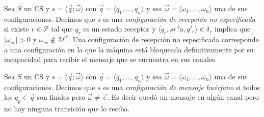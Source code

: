 \begin{definition}Sea $S$ un CS y $s= \langle \overrightarrow{q} ; \overrightarrow{\omega} \rangle$ con $\overrightarrow{q}= \langle q_1, \ldots, q_n \rangle$ y sea $\overrightarrow{\omega}= \langle \omega_1, \ldots, \omega_n \rangle$ una de sus configuraciones. Decimos que $s$ es una \textit{configuración de recepción no especificada} si existe $r \in \mathcal{P}$ tal que $q_r$ es un estado receptor y $\langle q_r,sr?a,q'_r \rangle \in \delta_r$ implica que $|\omega_{sr}| > 0$ y $\omega_{sr} \notin \mathcal{M}^*$. Una configuración de recepción no especificada corresponde a una configuración en la que la máquina está bloqueada definitivamente por su incapacidad para recibir el mensaje que se encuentra en sus canales.
\end{definition}

\begin{definition} Sea $S$ un CS y $s= \langle \overrightarrow{q} ; \overrightarrow{\omega} \rangle$ con $\overrightarrow{q}= \langle q_1, \ldots, q_n \rangle$ y sea $\overrightarrow{\omega}= \langle \omega_1, \ldots, \omega_n \rangle$ una de sus configuraciones. Decimos que $s$ es una \textit{configuración de mensaje huérfano} si todos los $q_p \in \overrightarrow{q}$ son finales pero $\overrightarrow{\omega} \neq \overrightarrow{\epsilon}$. Es decir quedó un mensaje en algún canal pero no hay ninguna transición que lo reciba.
\end{definition}

